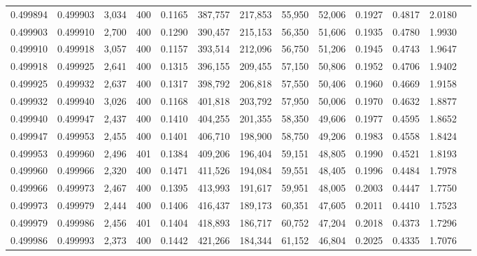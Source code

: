 \begin{tabular}{rrrrrrrrrrrrr}
0.499894 & 0.499903 & 3,034 & 400 &                                     0.1165 & 387,757 & 217,853 &  55,950 &  52,006 & 0.1927 & 0.4817 & 2.0180 \\
0.499903 & 0.499910 & 2,700 & 400 &                                     0.1290 & 390,457 & 215,153 &  56,350 &  51,606 & 0.1935 & 0.4780 & 1.9930 \\
0.499910 & 0.499918 & 3,057 & 400 &                                     0.1157 & 393,514 & 212,096 &  56,750 &  51,206 & 0.1945 & 0.4743 & 1.9647 \\
0.499918 & 0.499925 & 2,641 & 400 &                                     0.1315 & 396,155 & 209,455 &  57,150 &  50,806 & 0.1952 & 0.4706 & 1.9402 \\
0.499925 & 0.499932 & 2,637 & 400 &                                     0.1317 & 398,792 & 206,818 &  57,550 &  50,406 & 0.1960 & 0.4669 & 1.9158 \\
0.499932 & 0.499940 & 3,026 & 400 &                                     0.1168 & 401,818 & 203,792 &  57,950 &  50,006 & 0.1970 & 0.4632 & 1.8877 \\
0.499940 & 0.499947 & 2,437 & 400 &                                     0.1410 & 404,255 & 201,355 &  58,350 &  49,606 & 0.1977 & 0.4595 & 1.8652 \\
0.499947 & 0.499953 & 2,455 & 400 &                                     0.1401 & 406,710 & 198,900 &  58,750 &  49,206 & 0.1983 & 0.4558 & 1.8424 \\
0.499953 & 0.499960 & 2,496 & 401 &                                     0.1384 & 409,206 & 196,404 &  59,151 &  48,805 & 0.1990 & 0.4521 & 1.8193 \\
0.499960 & 0.499966 & 2,320 & 400 &                                     0.1471 & 411,526 & 194,084 &  59,551 &  48,405 & 0.1996 & 0.4484 & 1.7978 \\
0.499966 & 0.499973 & 2,467 & 400 &                                     0.1395 & 413,993 & 191,617 &  59,951 &  48,005 & 0.2003 & 0.4447 & 1.7750 \\
0.499973 & 0.499979 & 2,444 & 400 &                                     0.1406 & 416,437 & 189,173 &  60,351 &  47,605 & 0.2011 & 0.4410 & 1.7523 \\
0.499979 & 0.499986 & 2,456 & 401 &                                     0.1404 & 418,893 & 186,717 &  60,752 &  47,204 & 0.2018 & 0.4373 & 1.7296 \\
0.499986 & 0.499993 & 2,373 & 400 &                                     0.1442 & 421,266 & 184,344 &  61,152 &  46,804 & 0.2025 & 0.4335 & 1.7076 \\

\end{tabular}
